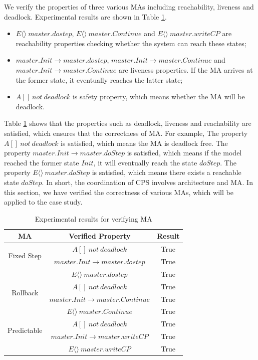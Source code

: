 We verify the properties of three various MAs including reachability, liveness and deadlock. Experimental results are shown in Table \ref{ta_r}.

\begin{itemize}
\item
$E \langle\rangle ~master.dostep$, $E\langle\rangle~master.Continue$ and $E\langle\rangle~master.writeCP$ are reachability properties checking whether the system can reach these states;
\item
$master.Init \rightarrow master.dostep$, $master.Init \rightarrow master.Continue$ and $master.Init \rightarrow master.Continue$ are liveness properties. If the MA arrives at the former state, it eventually reaches the latter state;
\item
$A[]~not~deadlock$ is safety property, which means whether the MA will be deadlock.
\end{itemize}

Table \ref{ta_r} shows that the properties such as deadlock, liveness and reachability are satisfied, which ensures that the correctness of MA. For example, The property $A[]~not~deadlock$ is satisfied, which means the MA is deadlock free. The property $master.Init \rightarrow master.doStep$ is satisfied, which means if the model reached the former state $Init$, it will eventually reach the state $doStep$. The property $E\langle\rangle~master.doStep$ is satisfied, which means there exists a reachable state $doStep$.  In short, the coordination of CPS involves architecture and MA. In this section, we have verified the correctness of various MAs, which will be applied to the case study.
\begin{table}
\caption{Experimental results for verifying MA}
\centering
\begin{tabular}{c c c}
        \hline
        MA & Verified Property & Result\\
        \hline
        \multirow{2}{2.0cm}{Fixed Step}
                & $A[]~not~deadlock$ & True\\
                & $master.Init \rightarrow master.dostep$ & True\\
                & $E\langle\rangle~master.dostep$ & True\\

        \hline
        \multirow{2}{2.0cm}{Rollback}
                & $A[]~not~deadlock$ & True\\
                & $master.Init \rightarrow master.Continue$ & True\\
                & $E\langle\rangle~master.Continue$ & True\\

        \hline
        \multirow{2}{2.0cm}{Predictable}
                & $A[]~not~deadlock$ & True\\
                & $master.Init \rightarrow  master.writeCP$ & True\\
                & $E\langle\rangle~master.writeCP$ & True\\
        \hline
\end{tabular}
\label{ta_r}
\end{table}

